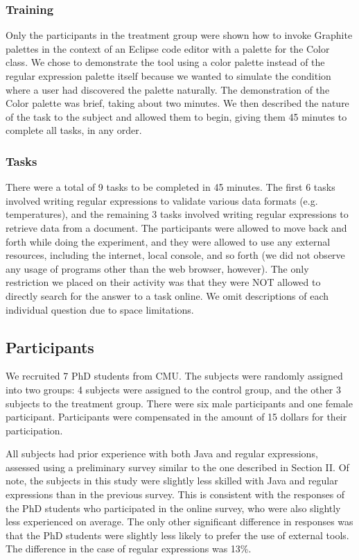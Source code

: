 \documentclass[10pt, conference, compsocconf]{IEEEtran}
\begin{document}
\subsubsection{Training}
Only the participants in the treatment group were shown how to invoke Graphite palettes in the context of an  Eclipse code editor with a palette for the Color class. We chose to demonstrate the tool using a color palette instead of the regular expression palette itself because we wanted to simulate the condition where a user had discovered the palette naturally. The demonstration of the Color palette was brief, taking about two minutes.
We then described the nature of the task to the subject and allowed them to begin, giving them 45 minutes to complete all tasks, in any order.

\subsubsection{Tasks}

There were a total of 9 tasks to be completed in 45 minutes. The first 6 tasks involved writing regular expressions to validate various data formats (e.g. temperatures), and the remaining 3 tasks involved writing regular expressions to retrieve data from a document. The participants were allowed to move back and forth while doing the experiment, and they were allowed to use any external resources, including the internet, local console, and so forth (we did not observe any usage of programs other than the web browser, however). The only restriction we placed on their activity was that they were NOT allowed to directly search for the answer to a task online. We omit descriptions of each individual question due to space limitations.

\subsection{Participants}

We recruited 7 PhD students from CMU. The subjects were randomly assigned into two groups: 4 subjects were assigned to the control group, and the other 3 subjects to the treatment group. There were six male participants and one female participant. Participants were compensated in the amount of 15 dollars for their participation.

All subjects had prior experience with both Java and regular expressions, assessed using a preliminary survey similar to the one described in Section II.  Of note, the subjects in this study were slightly less skilled with Java and regular expressions than in the previous survey. This is consistent with the responses of the PhD students who participated in the online survey, who were also slightly less experienced on average. The only other significant difference in responses was that the PhD students were slightly less likely to prefer the use of external tools. The difference in the case of regular expressions was 13\%.
\end{document}
